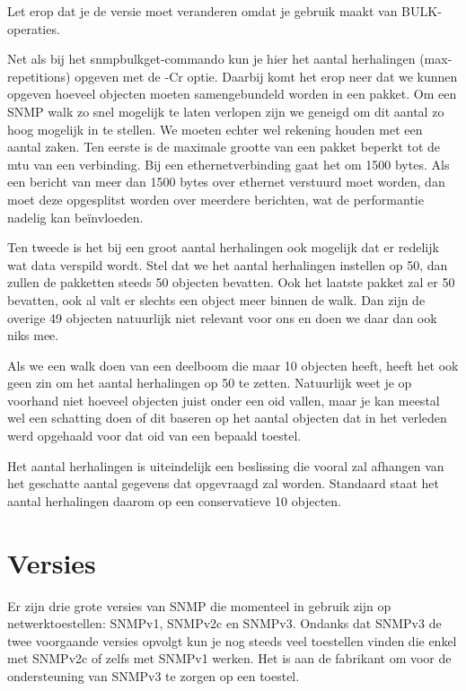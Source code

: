 Let erop dat je de versie moet veranderen omdat je gebruik maakt van BULK-operaties.

Net als bij het snmpbulkget-commando kun je hier het aantal herhalingen (max-repetitions) opgeven met de -Cr optie.
Daarbij komt het erop neer dat we kunnen opgeven hoeveel objecten moeten samengebundeld worden in een pakket.
Om een SNMP walk zo snel mogelijk te laten verlopen zijn we geneigd om dit aantal zo hoog mogelijk in te stellen.
We moeten echter wel rekening houden met een aantal zaken.
Ten eerste is de maximale grootte van een pakket beperkt tot de \gls{mtu} van een verbinding.
Bij een ethernetverbinding gaat het om 1500 bytes.
Als een bericht van meer dan 1500 bytes over ethernet verstuurd moet worden,
dan moet deze opgesplitst worden over meerdere berichten, wat de performantie nadelig kan beïnvloeden.

Ten tweede is het bij een groot aantal herhalingen ook mogelijk dat er redelijk wat data verspild wordt.
Stel dat we het aantal herhalingen instellen op 50, dan zullen de pakketten steeds 50 objecten bevatten.
Ook het laatste pakket zal er 50 bevatten, ook al valt er slechts een object meer binnen de walk.
Dan zijn de overige 49 objecten natuurlijk niet relevant voor ons en doen we daar dan ook niks mee.

Als we een walk doen van een deelboom die maar 10 objecten heeft, heeft het ook geen zin om het aantal herhalingen op 50 te zetten.
Natuurlijk weet je op voorhand niet hoeveel objecten juist onder een \gls{oid} vallen,
maar je kan meestal wel een schatting doen of dit baseren op het aantal objecten dat in het verleden werd opgehaald voor dat \gls{oid} van een bepaald toestel.

Het aantal herhalingen is uiteindelijk een beslissing die vooral zal afhangen van het geschatte aantal gegevens dat opgevraagd zal worden.
Standaard staat het aantal herhalingen daarom op een conservatieve 10 objecten.


\section{Versies}
\label{snmp-versies}
Er zijn drie grote versies van SNMP die momenteel in gebruik zijn op netwerktoestellen: SNMPv1, SNMPv2c en SNMPv3.
Ondanks dat SNMPv3 de twee voorgaande versies opvolgt kun je nog steeds veel toestellen vinden die enkel met SNMPv2c of zelfs met SNMPv1 werken.
Het is aan de fabrikant om voor de ondersteuning van SNMPv3 te zorgen op een toestel.



